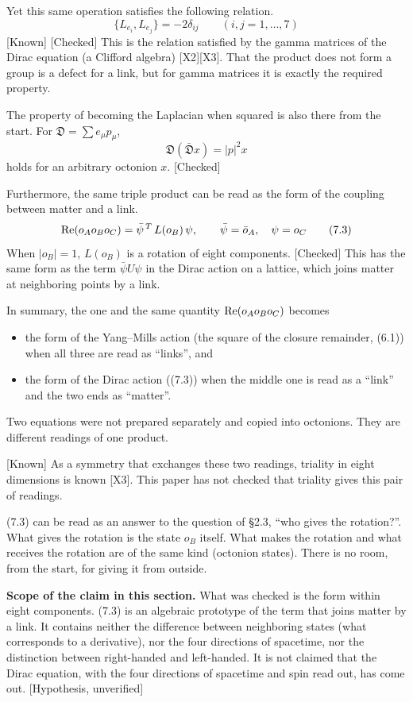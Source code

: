 \documentclass[
  a4paper,
]{article}
\providecommand{\tightlist}{%
  \setlength{\itemsep}{0pt}\setlength{\parskip}{0pt}}
\begin{document}
Yet this same operation satisfies the following relation. \[
\{L_{e_i}, L_{e_j}\} = -2\delta_{ij}\qquad(i, j = 1, \dots, 7) \tag{7.1}
\] {[}Known{]} {[}Checked{]} This is the relation satisfied by the gamma
matrices of the Dirac equation (a Clifford algebra) {[}X2{]}{[}X3{]}.
That the product does not form a group is a defect for a link, but for
gamma matrices it is exactly the required property.

The property of becoming the Laplacian when squared is also there from
the start. For \(\mathfrak{D} = \sum e_\mu p_\mu\), \[
\mathfrak{D}(\bar{\mathfrak{D}}x) = \lvert p\rvert^2 x \tag{7.2}
\] holds for an arbitrary octonion \(x\). {[}Checked{]}

Furthermore, the same triple product can be read as the form of the
coupling between matter and a link. \[
{\rm Re}(o_Ao_Bo_C) = \bar\psi^{\,T}\,L(o_B)\,\psi,\qquad \bar\psi = \bar o_A,\quad \psi = o_C \tag{7.3}
\] When \(\lvert o_B\rvert = 1\), \(L(o_B)\) is a rotation of eight
components. {[}Checked{]} This has the same form as the term
\(\bar\psi U\psi\) in the Dirac action on a lattice, which joins matter
at neighboring points by a link.

In summary, the one and the same quantity \({\rm Re}(o_Ao_Bo_C)\)
becomes

\begin{itemize}
\tightlist
\item
  the form of the Yang--Mills action (the square of the closure
  remainder, (6.1)) when all three are read as ``links'', and
\item
  the form of the Dirac action ((7.3)) when the middle one is read as a
  ``link'' and the two ends as ``matter''.
\end{itemize}

Two equations were not prepared separately and copied into octonions.
They are different readings of one product.

{[}Known{]} As a symmetry that exchanges these two readings, triality in
eight dimensions is known {[}X3{]}. This paper has not checked that
triality gives this pair of readings.

(7.3) can be read as an answer to the question of §2.3, ``who gives the
rotation?''. What gives the rotation is the state \(o_B\) itself. What
makes the rotation and what receives the rotation are of the same kind
(octonion states). There is no room, from the start, for giving it from
outside.

\textbf{Scope of the claim in this section.} What was checked is the
form within eight components. (7.3) is an algebraic prototype of the
term that joins matter by a link. It contains neither the difference
between neighboring states (what corresponds to a derivative), nor the
four directions of spacetime, nor the distinction between right-handed
and left-handed. It is not claimed that the Dirac equation, with the
four directions of spacetime and spin read out, has come out.
{[}Hypothesis, unverified{]}
\end{document}
